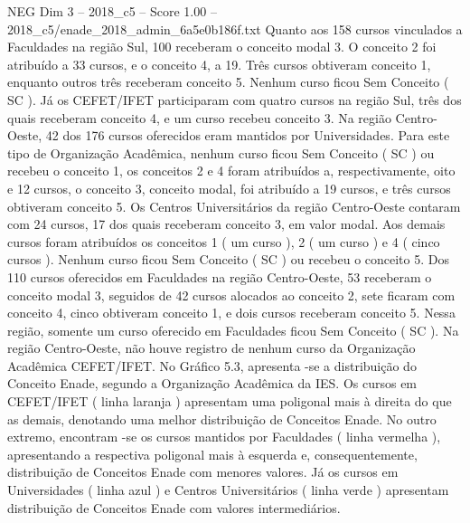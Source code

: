 \begin{textsample}{NEG Dim 3 – 2018\_c5 – Score 1.00 – 2018\_c5/enade\_2018\_admin\_6a5e0b186f.txt}
Quanto aos 158 cursos vinculados a Faculdades na região Sul, 100 receberam o conceito modal 3.
O conceito 2 foi atribuído a 33 cursos, e o conceito 4, a 19.
Três cursos obtiveram conceito 1, enquanto outros três receberam conceito 5.
Nenhum curso ficou Sem Conceito ( SC ).
Já os CEFET/IFET participaram com quatro cursos na região Sul, três dos quais receberam conceito 4, e um curso recebeu conceito 3.
Na região Centro-Oeste, 42 dos 176 cursos oferecidos eram mantidos por Universidades.
Para este tipo de Organização Acadêmica, nenhum curso ficou Sem Conceito ( SC ) ou recebeu o conceito 1, os conceitos 2 e 4 foram atribuídos a, respectivamente, oito e 12 cursos, o conceito 3, conceito modal, foi atribuído a 19 cursos, e três cursos obtiveram conceito 5.
Os Centros Universitários da região Centro-Oeste contaram com 24 cursos, 17 dos quais receberam conceito 3, em valor modal.
Aos demais cursos foram atribuídos os conceitos 1 ( um curso ), 2 ( um curso ) e 4 ( cinco cursos ).
Nenhum curso ficou Sem Conceito ( SC ) ou recebeu o conceito 5.
Dos 110 cursos oferecidos em Faculdades na região Centro-Oeste, 53 receberam o conceito modal 3, seguidos de 42 cursos alocados ao conceito 2, sete ficaram com conceito 4, cinco obtiveram conceito 1, e dois cursos receberam conceito 5.
Nessa região, somente um curso oferecido em Faculdades ficou Sem Conceito ( SC ).
Na região Centro-Oeste, não houve registro de nenhum curso da Organização Acadêmica CEFET/IFET.
No Gráfico 5.3, apresenta -se a distribuição do Conceito Enade, segundo a Organização Acadêmica da IES.
Os cursos em CEFET/IFET ( linha laranja ) apresentam uma poligonal mais à direita do que as demais, denotando uma melhor distribuição de Conceitos Enade.
No outro extremo, encontram -se os cursos mantidos por Faculdades ( linha vermelha ), apresentando a respectiva poligonal mais à esquerda e, consequentemente, distribuição de Conceitos Enade com menores valores.
Já os cursos em Universidades ( linha azul ) e Centros Universitários ( linha verde ) apresentam distribuição de Conceitos Enade com valores intermediários.

\end{textsample}

